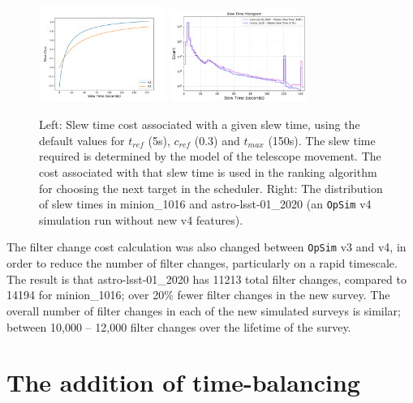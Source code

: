 \documentclass[DM,lsstdraft,authoryear,toc]{lsstdoc}
\newcommand{\opsim}{\texttt{OpSim}\xspace}
\begin{document}
\begin{figure}[ht]
\centering
\includegraphics[width=0.37\textwidth]{figures/slewcost}
\includegraphics[width=0.4\textwidth]{figures/slewtimes}
\caption{Left: Slew time cost associated with a given slew time, using the default values for $t_{ref}$ (5s), $c_{ref}$ (0.3) and $t_{max}$ (150s). The slew time required is determined by the model of the telescope movement. The cost associated with that slew time is used in the ranking algorithm for choosing the next target in the scheduler. Right: The distribution of slew times in minion\_1016 and astro-lsst-01\_2020 (an \opsim v4 simulation run without new v4 features).
\label{fig:slewcost}}
\end{figure}

The filter change cost calculation was also changed between \opsim v3 and v4, in order to reduce the number of filter changes, particularly on a rapid timescale. The result is that astro-lsst-01\_2020 has 11213 total filter changes, compared to 14194 for minion\_1016; over 20\% fewer filter changes in the new survey. The overall number of filter changes in each of the new simulated surveys is similar; between 10,000 -- 12,000 filter changes over the lifetime of the survey.

\section{The addition of time-balancing}
\end{document}
